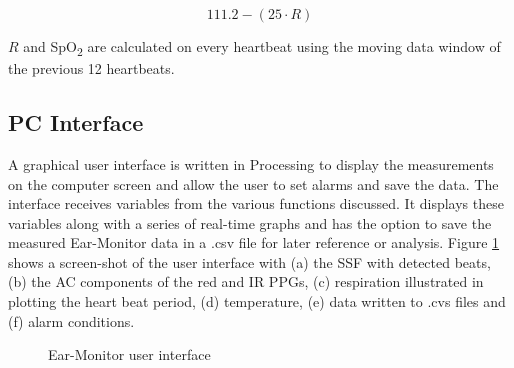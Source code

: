 \begin{equation}
\label{eq:Sats}
111.2-(25\cdot R)
\end{equation}

$R$ and SpO\textsubscript{2} are calculated on every heartbeat using the moving data window of the previous 12 heartbeats.

\subsection{PC Interface}
A graphical user interface is written in Processing to display the measurements on the computer screen and allow the user to set alarms and save the data. The interface receives variables from the various functions discussed. It displays these variables along with a series of real-time graphs and has the option to save the measured Ear-Monitor data in a .csv file for later reference or analysis. Figure \ref{fig:GUI} shows a screen-shot of the user interface with (a) the SSF with detected beats, (b) the AC components of the red and IR PPGs, (c) respiration illustrated in plotting the heart beat period, (d) temperature, (e) data written to .cvs files and (f) alarm conditions.

\begin{figure}[H]
\centering
\graphicspath{{figs/}}

\caption{Ear-Monitor user interface}
\label{fig:GUI}
\end{figure}

 
